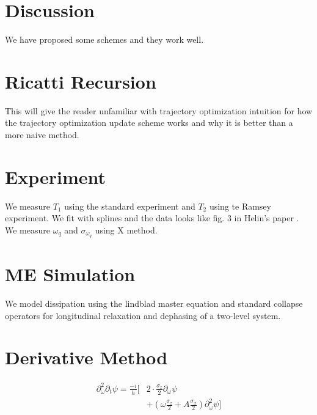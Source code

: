 \documentclass[
  amsfonts,
  amsmath,
  tbtags,
  amssymb,
  aps,
  nobibnotes,
  prl,
  twocolumn,
]{revtex4-2}
\begin{document}
\section{Discussion}
We have proposed some schemes and they work well.


\appendix
\section{Ricatti Recursion}
This will give the reader unfamiliar with trajectory
optimization intuition for how the trajectory optimization
update scheme works and why it is better than
a more naive method.


\section{Experiment}
We measure $T_{1}$ using the standard experiment
and $T_{2}$ using te Ramsey experiment. We fit with splines
and the data looks like fig. 3 in Helin's paper \cite{zhang2020universal}.
We measure $\omega_{q}$ and $\sigma_{\omega_{q}}$ using X method.


\section{ME Simulation}
We model dissipation using the lindblad master
equation and standard collapse operators for
longitudinal relaxation and dephasing
of a two-level system.


\section{Derivative Method}
\begin{equation}
  \begin{aligned}
    \partial_{\omega}^{2} \partial_{t} \psi
    = \frac{-i}{h} [&2 \cdot \frac{\sigma_{z}}{2} \partial_{\omega} \psi\\
      &+ (\omega \frac{\sigma_{z}}{2} + A \frac{\sigma_{x}}{2}) \partial_{\omega}^{2} \psi]
  \end{aligned}
\end{equation}



\end{document}
